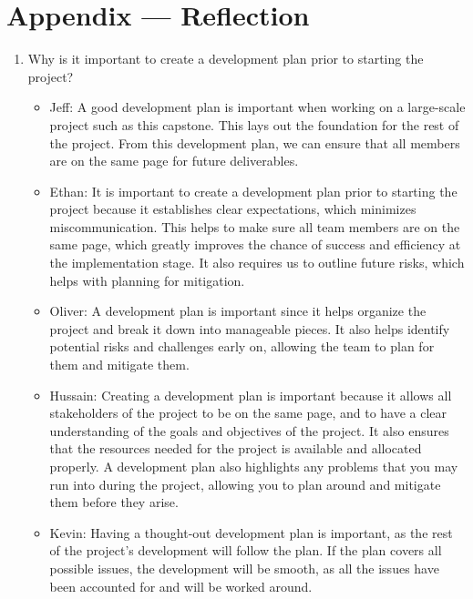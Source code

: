 \documentclass{article}
\begin{document}
\newpage{}

\section*{Appendix --- Reflection}



\begin{enumerate}
    \item Why is it important to create a development plan prior to starting the
    project?
	\begin{itemize}
		\item Jeff: A good development plan is important when working 
    on a large-scale project such as this capstone. 
    This lays out the foundation for the rest of the project.
    From this development plan, we can ensure that all
    members are on the same page for future deliverables.
    \item Ethan: It is important to create a development plan prior to starting
      the project because it establishes clear expectations, which minimizes
      miscommunication. This helps to make sure all team members are on the
      same page, which greatly improves the chance of success and efficiency at
      the implementation stage. It also requires us to outline future risks,
      which helps with planning for mitigation.
		\item Oliver: A development plan is important since it helps organize 
    the project and break it down into manageable pieces. It also helps 
    identify potential risks and challenges early on, allowing the team 
    to plan for them and mitigate them. 
		\item Hussain: Creating a development plan is important because it 
    allows all stakeholders of the project to be on the same page, 
    and to have a clear understanding of the goals and objectives 
    of the project. It also ensures that the resources needed for 
    the project is available and allocated properly. 
    A development plan also highlights any problems that 
    you may run into during the project, allowing you to plan 
    around and mitigate them before they arise.
		\item Kevin: Having a thought-out development plan is important, as the 
        rest of the project's development will follow the plan. If the plan 
        covers all possible issues, the development will be smooth, as all the 
        issues have been accounted for and will be worked around. 
	\end{itemize}

\end{enumerate}
\end{document}
